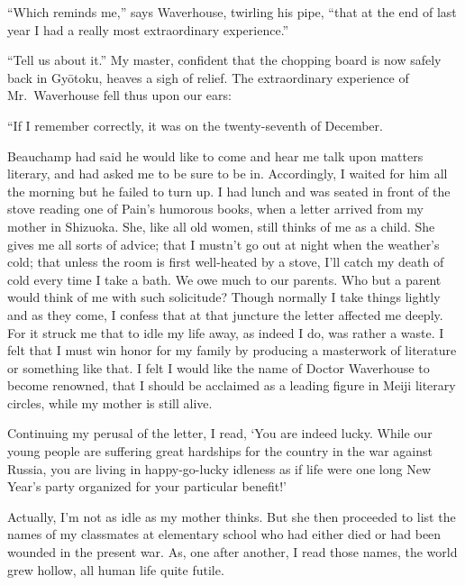 \documentclass[12pt, openright]{book}
\begin{document}
``Which reminds me,'' says Waverhouse, twirling his pipe, ``that at the
end of last year I had a really most extraordinary experience.''

``Tell us about it.'' My master, confident that the chopping board is
now safely back in Gyōtoku, heaves a sigh of relief. The extraordinary
experience of Mr.~Waverhouse fell thus upon our ears:

``If I remember correctly, it was on the twenty-seventh of December.

Beauchamp had said he would like to come and hear me talk upon matters
literary, and had asked me to be sure to be in. Accordingly, I waited
for him all the morning but he failed to turn up. I had lunch and was
seated in front of the stove reading one of Pain's humorous books, when
a letter arrived from my mother in Shizuoka. She, like all old women,
still thinks of me as a child. She gives me all sorts of advice; that I
mustn't go out at night when the weather's cold; that unless the room is
first well-heated by a stove, I'll catch my death of cold every time I
take a bath. We owe much to our parents. Who but a parent would think of
me with such solicitude? Though normally I take things lightly and as
they come, I confess that at that juncture the letter affected me
deeply. For it struck me that to idle my life away, as indeed I do, was
rather a waste. I felt that I must win honor for my family by producing
a masterwork of literature or something like that. I felt I would like
the name of Doctor Waverhouse to become renowned, that I should be
acclaimed as a leading figure in Meiji literary circles, while my mother
is still alive.

Continuing my perusal of the letter, I read, `You are indeed lucky.
While our young people are suffering great hardships for the country in
the war against Russia, you are living in happy-go-lucky idleness as if
life were one long New Year's party organized for your particular
benefit!'

Actually, I'm not as idle as my mother thinks. But she then proceeded to
list the names of my classmates at elementary school who had either died
or had been wounded in the present war. As, one after another, I read
those names, the world grew hollow, all human life quite futile.
\end{document}
